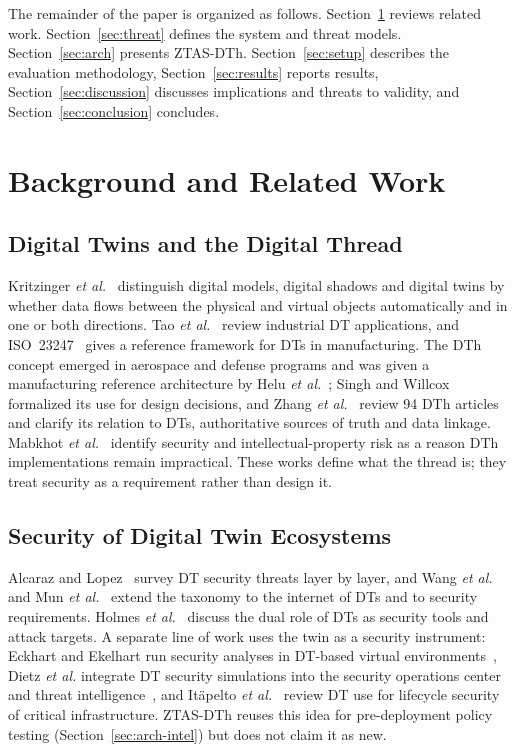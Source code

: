 \documentclass[journal]{IEEEtran}
\newcommand{\ztas}{ZTAS-DTh}
\begin{document}
The remainder of the paper is organized as follows. Section~\ref{sec:related} reviews related work. Section~\ref{sec:threat} defines the system and threat models. Section~\ref{sec:arch} presents \ztas{}. Section~\ref{sec:setup} describes the evaluation methodology, Section~\ref{sec:results} reports results, Section~\ref{sec:discussion} discusses implications and threats to validity, and Section~\ref{sec:conclusion} concludes.

\section{Background and Related Work}
\label{sec:related}
\subsection{Digital Twins and the Digital Thread}
Kritzinger \emph{et al.}~\cite{kritzinger2018dt} distinguish digital models, digital shadows and digital twins by whether data flows between the physical and virtual objects automatically and in one or both directions. Tao \emph{et al.}~\cite{tao2019dt} review industrial DT applications, and ISO~23247~\cite{iso23247} gives a reference framework for DTs in manufacturing. The DTh concept emerged in aerospace and defense programs and was given a manufacturing reference architecture by Helu \emph{et al.}~\cite{helu2017dth}; Singh and Willcox~\cite{singh2018dth} formalized its use for design decisions, and Zhang \emph{et al.}~\cite{zhang2024dth} review 94 DTh articles and clarify its relation to DTs, authoritative sources of truth and data linkage. Mabkhot \emph{et al.}~\cite{mabkhot2025mdp} identify security and intellectual-property risk as a reason DTh implementations remain impractical. These works define what the thread is; they treat security as a requirement rather than design it.

\subsection{Security of Digital Twin Ecosystems}
Alcaraz and Lopez~\cite{alcaraz2022dt} survey DT security threats layer by layer, and Wang \emph{et al.}~\cite{wang2023iodt} and Mun \emph{et al.}~\cite{mun2025survey} extend the taxonomy to the internet of DTs and to security requirements. Holmes \emph{et al.}~\cite{holmes2021dt} discuss the dual role of DTs as security tools and attack targets. A separate line of work uses the twin as a security instrument: Eckhart and Ekelhart run security analyses in DT-based virtual environments~\cite{eckhart2018sec,eckhart2019sota}, Dietz \emph{et al.} integrate DT security simulations into the security operations center and threat intelligence~\cite{dietz2020soc,dietz2022cti}, and It\"apelto \emph{et al.}~\cite{itapelto2025lifecycle} review DT use for lifecycle security of critical infrastructure. \ztas{} reuses this idea for pre-deployment policy testing (Section~\ref{sec:arch-intel}) but does not claim it as new.
\end{document}
